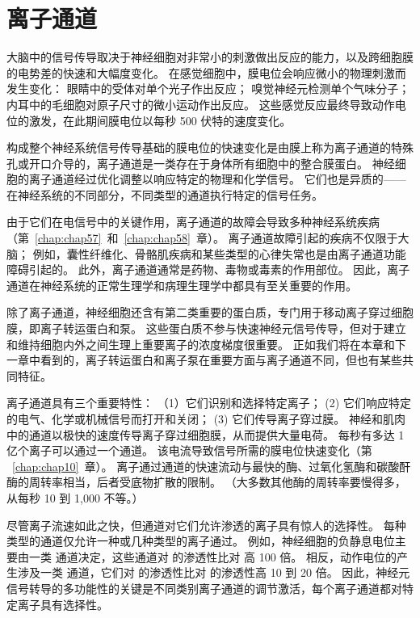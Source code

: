 \chapter{离子通道} \label{chap:chap8}

大脑中的信号传导取决于神经细胞对非常小的刺激做出反应的能力，以及跨细胞膜的电势差的快速和大幅度变化。 
在感觉细胞中，膜电位会响应微小的物理刺激而发生变化：
眼睛中的受体对单个光子作出反应；
嗅觉神经元检测单个气味分子；
内耳中的毛细胞对原子尺寸的微小运动作出反应。
这些感觉反应最终导致动作电位的激发，在此期间膜电位以每秒 500 伏特的速度变化。


构成整个神经系统信号传导基础的膜电位的快速变化是由膜上称为离子通道的特殊孔或开口介导的，离子通道是一类存在于身体所有细胞中的整合膜蛋白。
神经细胞的离子通道经过优化调整以响应特定的物理和化学信号。
它们也是异质的——在神经系统的不同部分，不同类型的通道执行特定的信号任务。


由于它们在电信号中的关键作用，离子通道的故障会导致多种神经系统疾病（第~\ref{chap:chap57}~和~\ref{chap:chap58}~章）。
离子通道故障引起的疾病不仅限于大脑；
例如，囊性纤维化、骨骼肌疾病和某些类型的心律失常也是由离子通道功能障碍引起的。
此外，离子通道通常是药物、毒物或毒素的作用部位。
因此，离子通道在神经系统的正常生理学和病理生理学中都具有至关重要的作用。


除了离子通道，神经细胞还含有第二类重要的蛋白质，专门用于移动离子穿过细胞膜，即离子转运蛋白和泵。
这些蛋白质不参与快速神经元信号传导，但对于建立和维持细胞内外之间生理上重要离子的浓度梯度很重要。
正如我们将在本章和下一章中看到的，离子转运蛋白和离子泵在重要方面与离子通道不同，但也有某些共同特征。


离子通道具有三个重要特性：
（1）它们识别和选择特定离子；
(2) 它们响应特定的电气、化学或机械信号而打开和关闭；
(3) 它们传导离子穿过膜。
神经和肌肉中的通道以极快的速度传导离子穿过细胞膜，从而提供大量电荷。
每秒有多达 1 亿个离子可以通过一个通道。
该电流导致信号所需的膜电位快速变化（第 ~\ref{chap:chap10}~章）。
离子通过通道的快速流动与最快的酶、过氧化氢酶和碳酸酐酶的周转率相当，后者受底物扩散的限制。
（大多数其他酶的周转率要慢得多，从每秒 10 到 1,000 不等。）


尽管离子流速如此之快，但通道对它们允许渗透的离子具有惊人的选择性。
每种类型的通道仅允许一种或几种类型的离子通过。
例如，神经细胞的负静息电位主要由一类  通道决定，这些通道对  的渗透性比对  高 100 倍。
相反，动作电位的产生涉及一类  通道，它们对  的渗透性比对  的渗透性高 10 到 20 倍。
因此，神经元信号转导的多功能性的关键是不同类别离子通道的调节激活，每个离子通道都对特定离子具有选择性。


